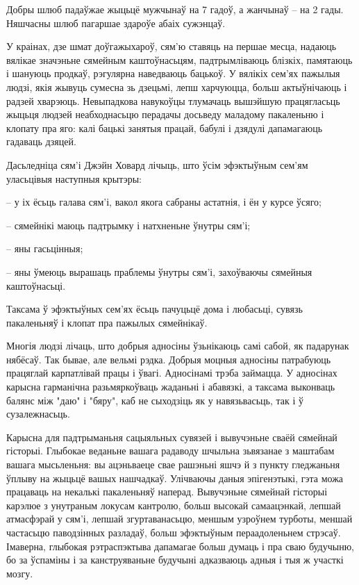 Добры шлюб падаўжае жыцьцё мужчынаў на 7 гадоў, а жанчынаў – на 2 гады. Няшчасны шлюб пагаршае здароўе абаіх сужэнцаў.

У краінах, дзе шмат доўгажыхароў, сям'ю ставяць на першае месца, надаюць вялікае значэньне сямейным каштоўнасьцям, падтрымліваюць блізкіх, памятаюць і шануюць продкаў, рэгулярна наведваюць бацькоў. У вялікіх сем'ях пажылыя людзі, якія жывуць сумесна зь дзецьмі, лепш харчуюцца, больш актыўнічаюць і радзей хварэюць. Невыпадкова навукоўцы тлумачаць вышэйшую працягласьць жыцьця людзей неабходнасьцю перадачы досьведу маладому пакаленьню і клопату пра яго: калі бацькі занятыя працай, бабулі і дзядулі дапамагаюць гадаваць дзяцей.

Дасьледніца сям'і Джэйн Ховард лічыць, што ўсім эфэктыўным сем'ям уласьцівыя наступныя крытэры: 

– у іх ёсьць галава сям'і, вакол якога сабраны астатнія, і ён у курсе ўсяго;

– сямейнікі маюць падтрымку і натхненьне ўнутры сям'і;

– яны гасьцінныя;

– яны ўмеюць вырашаць праблемы ўнутры сям'і, захоўваючы сямейныя каштоўнасьці.

Таксама ў эфэктыўных сем'ях ёсьць пачуцьцё дома і любасьці, сувязь пакаленьняў і клопат пра пажылых сямейнікаў.

Многія людзі лічаць, што добрыя адносіны ўзьнікаюць самі сабой, як падарунак нябёсаў. Так бывае, але вельмі рэдка. Добрыя моцныя адносіны патрабуюць працяглай карпатлівай працы і ўвагі. Адносінамі трэба займацца. У адносінах карысна гарманічна разьмяркоўваць жаданьні і абавязкі, а таксама выконваць балянс між "даю" і "бяру", каб не сыходзіць як у навязьвасьць, так і ў сузалежнасьць.

Карысна для падтрыманьня сацыяльных сувязей і вывучэньне сваёй сямейнай гісторыі. Глыбокае веданьне вашага радаводу шчыльна зьвязанае з маштабам вашага мысьленьня: вы ацэньваеце свае рашэньні яшчэ й з пункту гледжаньня ўплыву на жыцьцё вашых нашчадкаў. Улічваючы даныя эпігенэтыкі, гэта можа працаваць на некалькі пакаленьняў наперад. Вывучэньне сямейнай гісторыі карэлюе з унутраным локусам кантролю, больш высокай самаацэнкай, лепшай атмасфэрай у сям'і, лепшай згуртаванасьцю, меншым узроўнем турботы, меншай частасьцю паводзінных разладаў, больш эфэктыўным пераадоленьнем стрэсаў. Імаверна, глыбокая рэтраспэктыва дапамагае больш думаць і пра сваю будучыню, бо за ўспаміны і за канструяваньне будучыні адказваюць адныя і тыя ж участкі мозгу.

